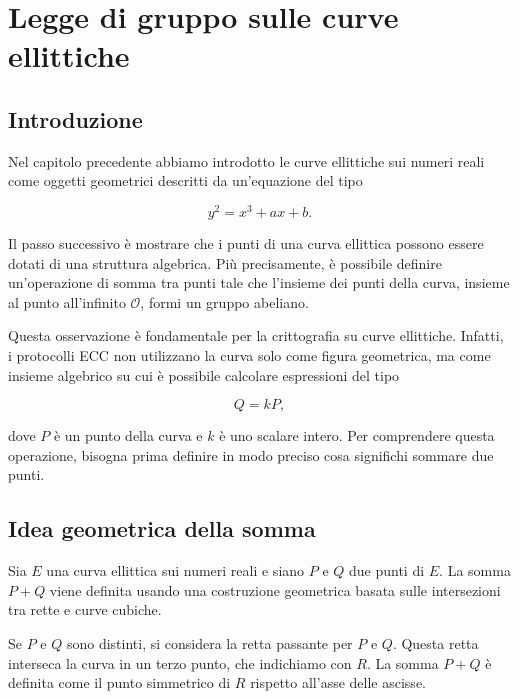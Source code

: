 \documentclass[12pt,a4paper,oneside]{report}
\begin{document}
\chapter{Legge di gruppo sulle curve ellittiche}

\section{Introduzione}

Nel capitolo precedente abbiamo introdotto le curve ellittiche sui numeri reali come oggetti geometrici descritti da un'equazione del tipo

\begin{equation}
    y^2 = x^3 + ax + b.
\end{equation}

Il passo successivo è mostrare che i punti di una curva ellittica possono essere dotati di una struttura algebrica. Più precisamente, è possibile definire un'operazione di somma tra punti tale che l'insieme dei punti della curva, insieme al punto all'infinito \(\mathcal{O}\), formi un gruppo abeliano.

Questa osservazione è fondamentale per la crittografia su curve ellittiche. Infatti, i protocolli ECC non utilizzano la curva solo come figura geometrica, ma come insieme algebrico su cui è possibile calcolare espressioni del tipo

\[
Q = kP,
\]

dove \(P\) è un punto della curva e \(k\) è uno scalare intero. Per comprendere questa operazione, bisogna prima definire in modo preciso cosa significhi sommare due punti.

\section{Idea geometrica della somma}

Sia \(E\) una curva ellittica sui numeri reali e siano \(P\) e \(Q\) due punti di \(E\). La somma \(P+Q\) viene definita usando una costruzione geometrica basata sulle intersezioni tra rette e curve cubiche.

Se \(P\) e \(Q\) sono distinti, si considera la retta passante per \(P\) e \(Q\). Questa retta interseca la curva in un terzo punto, che indichiamo con \(R\). La somma \(P+Q\) è definita come il punto simmetrico di \(R\) rispetto all'asse delle ascisse.
\end{document}
